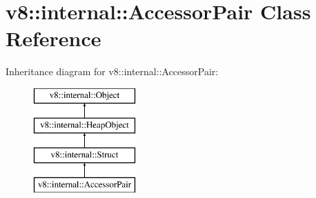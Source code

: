 \hypertarget{classv8_1_1internal_1_1_accessor_pair}{}\section{v8\+:\+:internal\+:\+:Accessor\+Pair Class Reference}
\label{classv8_1_1internal_1_1_accessor_pair}
Inheritance diagram for v8\+:\+:internal\+:\+:Accessor\+Pair\+:\begin{figure}[H]
\begin{center}
\leavevmode
\includegraphics[height=4.000000cm]{classv8_1_1internal_1_1_accessor_pair}
\end{center}
\end{figure}

